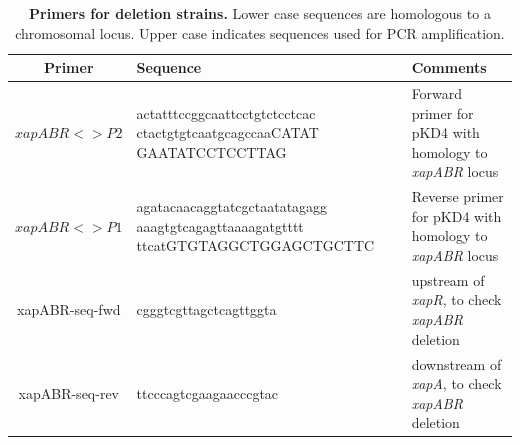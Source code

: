 \documentclass[10pt,letterpaper]{article}
\begin{document}
\begin{table}
\begin{tabular}{c p{5cm} p{4cm}}
Primer & Sequence & Comments \\
\hline
$xapABR<>P2$ &
actatttccggcaattcctgtctcctcac ctactgtgtcaatgcagccaaCATAT GAATATCCTCCTTAG &
Forward primer for pKD4 with homology to \textit{xapABR} locus
\\
$xapABR<>P1$ &
agatacaacaggtatcgctaatatagagg aaagtgtcagagttaaaagatgtttt ttcatGTGTAGGCTGGAGCTGCTTC &
Reverse primer for pKD4 with homology to \textit{xapABR} locus
\\
xapABR-seq-fwd &
cgggtcgttagctcagttggta &
upstream of \textit{xapR}, to check \textit{xapABR} deletion
\\
xapABR-seq-rev &
ttcccagtcgaagaacccgtac &
downstream of \textit{xapA}, to check \textit{xapABR} deletion
\end{tabular}
\caption{\textbf{Primers for deletion strains.}
Lower case sequences are homologous to a chromosomal locus.
Upper case indicates sequences used for PCR amplification.
}
\end{table}

\FloatBarrier
\newpage
\end{document}
